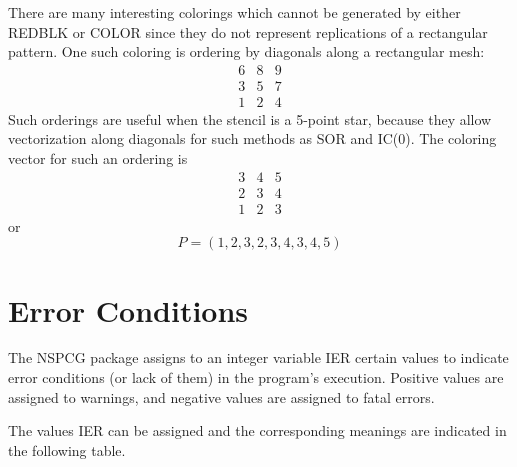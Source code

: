 \begin{enumerate}
\end{enumerate}
 
 
   There are many interesting colorings which cannot be generated
by either REDBLK or COLOR since they do not represent replications
of a rectangular pattern.  One such coloring is ordering by
diagonals along a rectangular mesh:
\[ \begin{array}{ccc}
      6 & 8 & 9 \\
      3 & 5 & 7 \\
      1 & 2 & 4
\end{array} \]
Such orderings are useful when the stencil is a 5-point star,
because they allow vectorization along diagonals for such methods
as SOR and IC(0).  The coloring vector for such an ordering is
\[ \begin{array}{ccc}
      3 & 4 & 5 \\
      2 & 3 & 4 \\
      1 & 2 & 3
\end{array} \]
or
\[ P = (1,2,3,2,3,4,3,4,5) \]
 
\newpage
\section{Error Conditions}
\label{ier}
\indent
 
    The NSPCG package assigns to an integer variable IER certain
values to indicate error conditions (or lack of them) in the
program's execution.  Positive values are assigned to warnings, and 
negative values are assigned to fatal errors.
 
    The values IER can be assigned and the corresponding meanings
are indicated in the following table.

